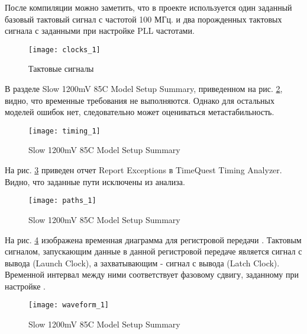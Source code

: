 После компиляции можно заметить, что в проекте используется один заданный базовый тактовый сигнал с частотой 100 МГц. и два порожденных тактовых сигнала с заданными при настройке PLL частотами.
\begin{figure}[H]
	\begin{center}
		\texttt{[image: clocks\_1]}
		\caption{Тактовые сигналы}
		\label{fig:clocks_1}
	\end{center}
\end{figure}

В разделе Slow 1200mV 85C Model Setup Summary, приведенном на рис. \ref{fig:timing_1}, видно, что временные требования не выполняются. Однако для остальных моделей ошибок нет, следовательно может оцениваться метастабильность.

\begin{figure}[H]
	\begin{center}
		\texttt{[image: timing\_1]}
		\caption{Slow 1200mV 85C Model Setup Summary}
		\label{fig:timing_1}
	\end{center}
\end{figure}

На рис. \ref{fig:paths_1} приведен отчет Report Exceptions в TimeQuest Timing Analyzer. Видно, что заданные пути исключены из анализа. 

\begin{figure}[H]
	\begin{center}
		\texttt{[image: paths\_1]}
		\caption{Slow 1200mV 85C Model Setup Summary}
		\label{fig:paths_1}
	\end{center}
\end{figure}

\newpage

На рис. \ref{fig:waveform_1} изображена временная диаграмма для регистровой передачи . Тактовым сигналом, запускающим данные в данной регистровой передаче является сигнал с вывода  (Launch Clock), а захватывающим - сигнал с вывода  (Latch Clock). Временной интервал между ними соответствует фазовому сдвигу, заданному при настройке .

\begin{figure}[H]
	\begin{center}
		\texttt{[image: waveform\_1]}
		\caption{Slow 1200mV 85C Model Setup Summary}
		\label{fig:waveform_1}
	\end{center}
\end{figure}

